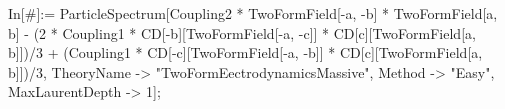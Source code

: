 In[\#]:= ParticleSpectrum[Coupling2 * TwoFormField[-a, -b] * TwoFormField[a, b] - (2 * Coupling1 * CD[-b][TwoFormField[-a, -c]] * CD[c][TwoFormField[a, b]])/3 + (Coupling1 * CD[-c][TwoFormField[-a, -b]] * CD[c][TwoFormField[a, b]])/3, TheoryName -> "TwoFormEectrodynamicsMassive", Method -> "Easy", MaxLaurentDepth -> 1]; 